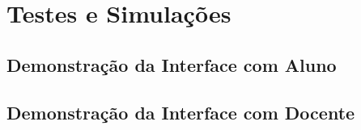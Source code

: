 \chapter{Testes e Simulações}

\section{Demonstração da Interface com Aluno}

\section{Demonstração da Interface com Docente}
